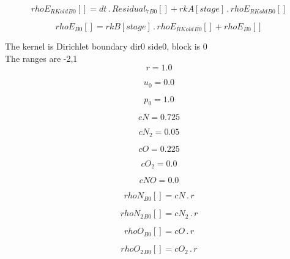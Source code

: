\documentclass{article}
\begin{document}
\begin{dmath}{rhoE_{RKold}{_{B0}}}[{}] = dt \,.\, {Residual_{7}{_{B0}}}[{}] + {rkA}[{stage}] \,.\, {rhoE_{RKold}{_{B0}}}[{}]\end{dmath}

\begin{dmath}{rhoE{_{B0}}}[{}] = {rkB}[{stage}] \,.\, {rhoE_{RKold}{_{B0}}}[{}] + {rhoE{_{B0}}}[{}]\end{dmath}

\noindent The kernel is Dirichlet boundary dir0 side0, block is 0\\\noindent The ranges are -2,1\\\begin{dmath}r = 1.0\end{dmath}

\begin{dmath}u_{0} = 0.0\end{dmath}

\begin{dmath}p_{0} = 1.0\end{dmath}

\begin{dmath}cN = 0.725\end{dmath}

\begin{dmath}cN_{2} = 0.05\end{dmath}

\begin{dmath}cO = 0.225\end{dmath}

\begin{dmath}cO_{2} = 0.0\end{dmath}

\begin{dmath}cNO = 0.0\end{dmath}

\begin{dmath}{rhoN{_{B0}}}[{}] = cN \,.\, r\end{dmath}

\begin{dmath}{rhoN_{2}{_{B0}}}[{}] = cN_{2} \,.\, r\end{dmath}

\begin{dmath}{rhoO{_{B0}}}[{}] = cO \,.\, r\end{dmath}

\begin{dmath}{rhoO_{2}{_{B0}}}[{}] = cO_{2} \,.\, r\end{dmath}
\end{document}
